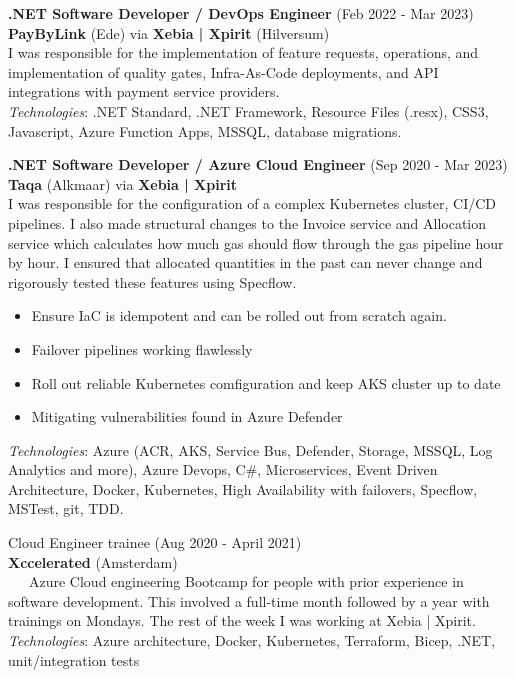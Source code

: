 \documentclass[a4paper,8pt]{article}
\begin{document}
\textbf{.NET Software Developer / DevOps Engineer} (Feb 2022 - Mar 2023) \\
\textbf{PayByLink} (Ede) via \textbf{Xebia | Xpirit} (Hilversum) \\
 I was responsible for the implementation of feature requests, operations, and implementation of quality gates, Infra-As-Code deployments, and API integrations with payment service providers.\\
\textit{Technologies}: .NET Standard, .NET Framework, Resource Files (.resx), CSS3, Javascript, Azure Function Apps, MSSQL, database migrations.


\textbf{.NET Software Developer / Azure Cloud Engineer} (Sep 2020 - Mar 2023) \\
\textbf{Taqa} (Alkmaar) via \textbf{Xebia | Xpirit} \\
 I was responsible for the configuration of a complex Kubernetes cluster, CI/CD pipelines. 
 I also made structural changes to the Invoice service and Allocation service which calculates how much gas should flow through the gas pipeline hour by hour. I ensured that allocated quantities in the past can never change and rigorously tested these features using Specflow. \\
 \begin{itemize}
 \item Ensure IaC is idempotent and can be rolled out from scratch again.
 \item Failover pipelines working flawlessly
 \item Roll out reliable Kubernetes comfiguration and keep AKS cluster up to date
  \item Mitigating vulnerabilities found in Azure Defender
 \end{itemize}
\textit{Technologies}: Azure (ACR, AKS, Service Bus, Defender, Storage, MSSQL, Log Analytics and more), Azure Devops, C\#,  Microservices, Event Driven Architecture, Docker, Kubernetes, High Availability with failovers, Specflow, MSTest, git, TDD. 

Cloud Engineer trainee (Aug 2020 - April 2021) \\
\textbf{Xccelerated} (Amsterdam) \\
\ \ \ Azure Cloud engineering Bootcamp for people with prior experience in software development. This involved a full-time month followed by a year with trainings on Mondays.  The rest of the week I was working at Xebia | Xpirit. \\
\textit{Technologies}: Azure architecture, Docker, Kubernetes, Terraform, Bicep, .NET, unit/integration tests
\end{document}
